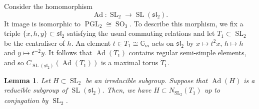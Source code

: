 \documentclass[11pt,oneside,dvipsnames]{amsart}
\theoremstyle{plain}
\newtheorem{Lem}[Thm]{Lemma}
\theoremstyle{definition}
\theoremstyle{named}
\DeclareMathOperator{\Ad}{Ad}
\DeclareMathOperator{\PGL}{PGL}
\DeclareMathOperator{\SL}{SL}
\DeclareMathOperator{\SO}{SO}
\begin{document}
Consider the homomorphism
$$
\Ad:\SL_2\longrightarrow\SL(\mathfrak{sl}_2).
$$
It image is isomorphic to $\PGL_2\cong\SO_3$. To describe this morphism, we fix a triple $\{x,h,y\}\subset\mathfrak{sl}_2$ satisfying the usual commuting relations and let $T_1\subset\SL_2$ be the centraliser of $h$. An element $t\in T_1\cong\mathbb{G}_m$ acts on $\mathfrak{sl}_2$ by $x\mapsto t^2x$, $h\mapsto h$ and $y\mapsto t^{-2}y$. It follows that $\Ad(T_1)$ contains regular semi-simple elements, and so $C_{\SL(\mathfrak{sl}_2)}(\Ad(T_1))$ is a maximal torus $\tilde{T}_1$.
\begin{Lem}\label{Lem-H-N_SL2(T)}
Let $H\subset\SL_2$ be an irreducible subgroup. Suppose that $\Ad(H)$ is a reducible subgroup of $\SL(\mathfrak{sl}_2)$. Then, we have $H\subset N_{\SL_2}(T_1)$ up to conjugation by $\SL_2$.
\end{Lem}
\end{document}
